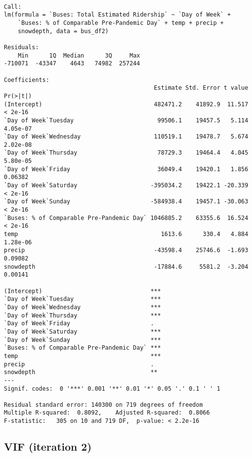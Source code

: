 \documentclass[
  letterpaper,
  DIV=11,
  numbers=noendperiod]{scrartcl}
\begin{document}
\begin{verbatim}

Call:
lm(formula = `Buses: Total Estimated Ridership` ~ `Day of Week` + 
    `Buses: % of Comparable Pre-Pandemic Day` + temp + precip + 
    snowdepth, data = bus_df2)

Residuals:
    Min      1Q  Median      3Q     Max 
-710071  -43347    4643   74982  257244 

Coefficients:
                                           Estimate Std. Error t value Pr(>|t|)
(Intercept)                                482471.2    41892.9  11.517  < 2e-16
`Day of Week`Tuesday                        99506.1    19457.5   5.114 4.05e-07
`Day of Week`Wednesday                     110519.1    19478.7   5.674 2.02e-08
`Day of Week`Thursday                       78729.3    19464.4   4.045 5.80e-05
`Day of Week`Friday                         36049.4    19420.1   1.856  0.06382
`Day of Week`Saturday                     -395034.2    19422.1 -20.339  < 2e-16
`Day of Week`Sunday                       -584938.4    19457.1 -30.063  < 2e-16
`Buses: % of Comparable Pre-Pandemic Day` 1046885.2    63355.6  16.524  < 2e-16
temp                                         1613.6      330.4   4.884 1.28e-06
precip                                     -43598.4    25746.6  -1.693  0.09082
snowdepth                                  -17884.6     5581.2  -3.204  0.00141
                                             
(Intercept)                               ***
`Day of Week`Tuesday                      ***
`Day of Week`Wednesday                    ***
`Day of Week`Thursday                     ***
`Day of Week`Friday                       .  
`Day of Week`Saturday                     ***
`Day of Week`Sunday                       ***
`Buses: % of Comparable Pre-Pandemic Day` ***
temp                                      ***
precip                                    .  
snowdepth                                 ** 
---
Signif. codes:  0 '***' 0.001 '**' 0.01 '*' 0.05 '.' 0.1 ' ' 1

Residual standard error: 140300 on 719 degrees of freedom
Multiple R-squared:  0.8092,    Adjusted R-squared:  0.8066 
F-statistic:   305 on 10 and 719 DF,  p-value: < 2.2e-16
\end{verbatim}

\hypertarget{vif-iteration-2}{%
\subsection{VIF (iteration 2)}\label{vif-iteration-2}}
\end{document}
